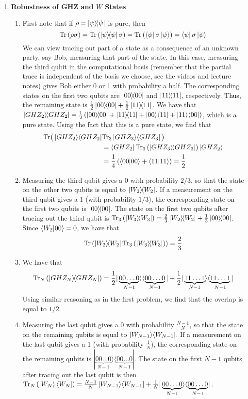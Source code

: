 \documentclass[12pt]{article}
\begin{document}
\begin{enumerate}
\item {\bf Robustness of GHZ and $W$ States}\label{ex:robust-GHZ}
\begin{enumerate}
\item
	First note that if $\rho = \ket{\psi}\!\!\bra{\psi}$ is pure, then
	\[\mathrm{Tr}\left(\rho \sigma\right) = \mathrm{Tr}\left(\ket{\psi}\!\!\bra{\psi} \sigma\right) = \mathrm{Tr}\left(\bra{\psi} \sigma\ket{\psi}\right) = \bra{\psi} \sigma\ket{\psi}\]
	We can view tracing out part of a state as a consequence of an unknown party, say Bob, measuring that part of the state. In this case, measuring the third qubit in the computational basis (remember that the partial trace is independent of the basis we choose, see the videos and lecture notes) gives Bob either 0 or 1 with probability a half. The corresponding states on the first two qubits are $\ket{00}\!\!\bra{00}$ and $\ket{11}\!\!\bra{11}$, respectively. Thus, the remaining state is $\frac{1}{2}\ket{00}\!\!\bra{00}+\frac{1}{2}\ket{11}\!\!\bra{11}$.
	We have that $\proj{GHZ_2} = \frac{1}{2}\left(\proj{00}+\proj{11}+\ketbra{00}{11}+\ketbra{11}{00} \right)$, which is a pure state. Using the fact that this is a pure state, we find that
	\begin{align*}
		\mathrm{Tr}\big(\ket{GHZ_2}\!\bra{GHZ_2} & \mathrm{Tr}_3\ket{GHZ_3}\!\bra{GHZ_3}\big) \\
		& = \bra{GHZ_2} \mathrm{Tr}_3 \left(\ket{GHZ_3}\!\!\bra{GHZ_3}\right)\ket{GHZ_2}\\
		& = \frac{1}{4}\left(\langle 00 \vert 00\rangle+\langle 11 \vert 11\rangle\right)=\frac{1}{2}
	\end{align*}
\item
	Measuring the third qubit gives a 0 with probability $2/3$, so that the state on the other two qubits is equal to $\ket{W_2}\!\!\bra{W_2}$. If a measurement on the third qubit gives a 1 (with probability $1/3$), the corresponding state on the first two qubits is $\ket{00}\!\!\bra{00}$. The state on the first two qubits after tracing out the third qubit is $\mathrm{Tr}_3\left(\ket{W_3}\!\!\bra{W_3}\right) = \frac{2}{3}\ket{W_2}\!\!\bra{W_2}+\frac{1}{3}\ket{00}\!\!\bra{00}$.
	Since $\langle{W_2}|{00}\rangle = 0$, we have that $$\mathrm{Tr}\left(\ket{W_2}\!\!\bra{W_2} \mathrm{Tr}_3\left(\ket{W_3}\!\!\bra{W_3}\right)\right) = \frac{2}{3}$$
\item
	We have that
	\[\mathrm{Tr}_N \left(\ket{GHZ_N}\!\!\bra{GHZ_N}\right) = \frac{1}{2}|\underbrace{00\ldots0}_{N-1}\rangle\langle\underbrace{00\ldots0}_{N-1}|+\frac{1}{2}|\underbrace{11\ldots1}_{N-1}\rangle\langle\underbrace{11\ldots1}_{N-1}|\]
	Using similar reasoning as in the first problem, we find that the overlap is equal to $1/2$.
\item	
	Measuring the last qubit gives a $0$ with probability $\frac{N-1}{N}$, so that the state on the remaining qubits is equal to $\ket{W_{N-1}}\!\bra{W_{N-1}}$. If a measurement on the last qubit gives a 1 (with probability $\frac{1}{N}$), the corresponding state on the remaining qubits is $|\underbrace{00\ldots0}_{N-1}\rangle \langle\underbrace{00\ldots0}_{N-1} |$. The state on the first $N-1$ qubits after tracing out the last qubit is then $\mathrm{Tr}_N\left(\left| W_N \right\rangle \left\langle W_N \right|\right) = \frac{N-1}{N}\ket{W_{N-1}}\!\bra{W_{N-1}}+\frac{1}{N}|\underbrace{00\ldots0}_{N-1}\rangle \langle \underbrace{00\ldots0}_{N-1}|$.

\end{enumerate}
\end{enumerate}
\end{document}
